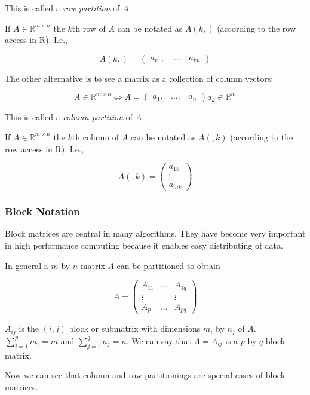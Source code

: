 This is called a \textit{row partition} of $A$.


If $A \in \mathbb{R}^{m \times n}$ the $k$th row of $A$ can be notated
as $A(k,)$ (according to the row access in R). I.e.,

$$ A(k,) = \left( \begin{array}{ccc}
a_{k1}, & \ldots, & a_{kn}
\end{array} \right)
$$


The other alternative is to see a matrix as a collection of column
vectors:

$$ A \in \mathbb{R}^{m \times n} \Longleftrightarrow A = 
\left( \begin{array}{ccc}
a_{1}, & \ldots, & a_{n}
\end{array} \right)
a_{k} \in \mathbb{R}^m 
 $$

This is called a \textit{column partition} of $A$.


If $A \in \mathbb{R}^{m \times n}$ the $k$th column of $A$ can be notated
as $A(,k)$ (according to the row access in R). I.e.,

$$ A(,k) = \left( \begin{array}{c}
a_{1k} \\
\vdots \\
a_{mk} 
\end{array} \right)
 $$

\subsubsection{Block Notation}

Block matrices are central in many algorithms. They have become very
important in high performance computing because it enables
easy distributing of data. 

In general a $m$ by $n$ matrix $A$ can be partitioned to obtain

$$ 
A = \left( \begin{array}{ccc}
A_{11} & \ldots & A_{1q} \\
\vdots &        & \vdots \\
A_{p1} & \ldots & A_{pq}
\end{array} \right)
$$

$A_{ij}$ is the $(i,j)$ block or submatrix with dimensions $m_i$ by
$n_j$ of $A$. $\sum_{i=1}^p m_i = m$ and $\sum_{j=1}^q n_j = n$. 
We can say that $A = A_{ij}$ is a $p$ by $q$ block
matrix.   

Now we can see that column and row partitionings are special cases of
block matrices.

